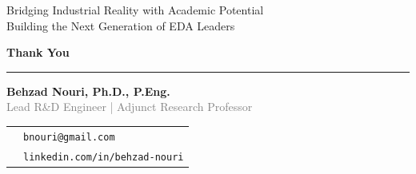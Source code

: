 
{ %
	\begin{frame}[plain]
		\begin{center}
			\vfill
			{\LARGE%
				Bridging Industrial Reality with Academic Potential\\[0.5cm]
				Building the Next Generation of EDA Leaders
			}
			\vfill
			\par   \vspace{0.5cm}
			{\Huge \textbf{\textcolor{USaskGreen}{Thank You}}}
			\par  \vspace{0.25cm}
			{\color{USaskGreen}\rule{0.6\textwidth}{1.5pt}}\par
			{\large \textbf{Behzad Nouri, Ph.D., P.Eng.}} \\[0.1cm]
			{\textcolor{gray}{Lead R\&D Engineer | Adjunct Research Professor}}\\[8pt]
			{\small
			\begin{tabular}{cl}
				\color{USaskGreen}{\faEnvelope} & \texttt{bnouri@gmail.com}                                                                                \\
				\color{USaskGreen}{\faLinkedin} &                                                                                                          %
				\href{https://linkedin.com/in/behzad-nourilinkedin.com/in/s-behzad-nouri-ph-d-p-eng-mieee-8b111429}{}\texttt{linkedin.com/in/behzad-nouri} \\
			\end{tabular}
			}

		\end{center}
	\end{frame}
}

